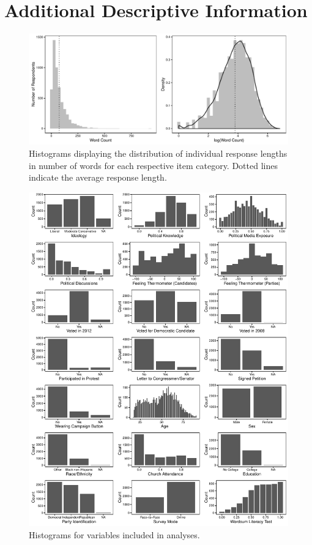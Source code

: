 \documentclass[12pt]{article}
\begin{document}
\clearpage
\section{Additional Descriptive Information}\label{app:oview}
\renewcommand\thefigure{\thesection.\arabic{figure}}
\renewcommand\thetable{\thesection.\arabic{table}}
\setcounter{figure}{0}
\setcounter{table}{0}



\begin{figure}[h]\centering
\includegraphics[width=\textwidth]{../calc/fig/app_wc.pdf}
\caption{Histograms displaying the distribution of individual response lengths in number of words for each respective item category. Dotted lines indicate the average response length.}\label{fig:appB2num}
\end{figure}

\begin{figure}[h]\centering
\includegraphics[width=\textwidth]{../calc/fig/app_desc.pdf}
\caption{Histograms for variables included in analyses.}\label{fig:app_desc}
\end{figure}
\end{document}
